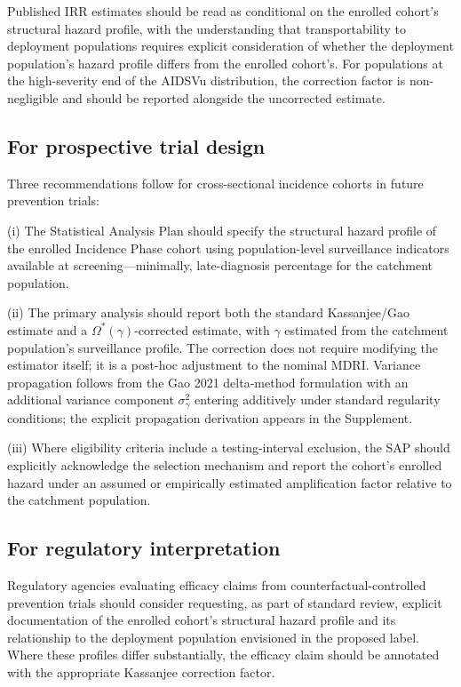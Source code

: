 \documentclass[11pt]{article}
\begin{document}
Published IRR estimates should be read as conditional on the enrolled cohort's structural hazard profile, with the understanding that transportability to deployment populations requires explicit consideration of whether the deployment population's hazard profile differs from the enrolled cohort's. For populations at the high-severity end of the AIDSVu distribution, the correction factor is non-negligible and should be reported alongside the uncorrected estimate.

\subsection{For prospective trial design}

Three recommendations follow for cross-sectional incidence cohorts in future prevention trials:

(i) The Statistical Analysis Plan should specify the structural hazard profile of the enrolled Incidence Phase cohort using population-level surveillance indicators available at screening---minimally, late-diagnosis percentage for the catchment population.

(ii) The primary analysis should report both the standard Kassanjee/Gao estimate and a $\Omega^*(\gamma)$-corrected estimate, with $\gamma$ estimated from the catchment population's surveillance profile. The correction does not require modifying the estimator itself; it is a post-hoc adjustment to the nominal MDRI. Variance propagation follows from the Gao 2021 delta-method formulation with an additional variance component $\sigma^2_\gamma$ entering additively under standard regularity conditions; the explicit propagation derivation appears in the Supplement.

(iii) Where eligibility criteria include a testing-interval exclusion, the SAP should explicitly acknowledge the selection mechanism and report the cohort's enrolled hazard under an assumed or empirically estimated amplification factor relative to the catchment population.

\subsection{For regulatory interpretation}

Regulatory agencies evaluating efficacy claims from counterfactual-controlled prevention trials should consider requesting, as part of standard review, explicit documentation of the enrolled cohort's structural hazard profile and its relationship to the deployment population envisioned in the proposed label. Where these profiles differ substantially, the efficacy claim should be annotated with the appropriate Kassanjee correction factor.
\end{document}
